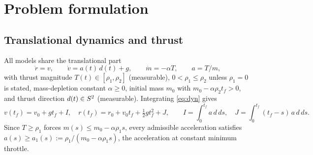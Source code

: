 \section{Problem formulation}\label{sec:formulation}

\subsection{Translational dynamics and thrust}
All models share the translational part
\begin{equation}\label{eq:dyn}
\dot r=v,\qquad \dot v=a(t)\,d(t)+g,\qquad \dot m=-\alpha T,\qquad a=T/m,
\end{equation}
with thrust magnitude $T(t)\in[\rho_1,\rho_2]$ (measurable), $0<\rho_1\le\rho_2$ unless $\rho_1=0$ is stated,
mass-depletion constant $\alpha\ge0$, initial mass $m_0$ with $m_0-\alpha\rho_2t_f>0$, and thrust direction
$d(t)\in S^2$ (measurable). Integrating \eqref{eq:dyn} gives
\begin{equation}\label{eq:IJ}
v(t_f)=v_0+gt_f+I,\quad r(t_f)=r_0+v_0t_f+\tfrac12gt_f^2+J,\qquad
I=\int_0^{t_f}a\,d\,ds,\quad J=\int_0^{t_f}(t_f-s)\,a\,d\,ds.
\end{equation}
Since $T\ge\rho_1$ forces $m(s)\le m_0-\alpha\rho_1s$, every admissible acceleration satisfies
$a(s)\ge a_1(s):=\rho_1/(m_0-\alpha\rho_1s)$, the acceleration at constant minimum throttle.

